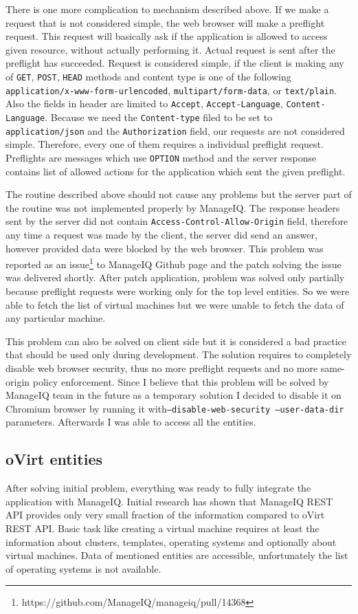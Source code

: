 There is one more complication to mechanism described above. If we make a request that is not considered simple, the web browser will make a preflight request. This request will basically ask if the application is allowed to access given resource, without actually performing it. Actual request is sent after the preflight has succeeded. Request is considered simple, if the client is making any of \texttt{GET}, \texttt{POST}, \texttt{HEAD} methods and content type is one of the following \texttt{application/x-www-form-urlencoded}, \texttt{multipart/form-data}, or \texttt{text/plain}. Also the fields in header are limited to \texttt{Accept}, \texttt{Accept-Language}, \texttt{Content-Language}. Because we need the \texttt{Content-type} filed to be set to \texttt{application/json} and the \texttt{Authorization} field, our requests are not considered simple. Therefore, every one of them requires a individual preflight request. Preflights are messages which use \texttt{OPTION} method and the server response contains list of allowed actions for the application which sent the given preflight.

The routine described above should not cause any problems but the server part of the routine was not implemented properly by ManageIQ. The response headers sent by the server did not contain \texttt{Access-Control-Allow-Origin} field, therefore any time a request was made by the client, the server did send an answer, however provided data were blocked by the web browser. This problem was reported as an issue\footnote{https://github.com/ManageIQ/manageiq/pull/14368} to ManageIQ Github page and the patch solving the issue was delivered shortly. After patch application, problem was solved only partially because preflight requests were working only for the top level entities. So we were able to fetch the list of virtual machines but we were unable to fetch the data of any particular machine.

This problem can also be solved on client side but it is considered a bad practice that should be used only during development. The solution requires to completely disable web browser security, thus no more preflight requests and no more same-origin policy enforcement. Since I believe that this problem will be solved by ManageIQ team in the future as a temporary solution I decided to disable it on Chromium browser by running it with\texttt{--disable-web-security --user-data-dir} parameters. Afterwards I was able to access all the entities.

\subsection{oVirt entities}
After solving initial problem, everything was ready to fully integrate the application with ManageIQ. Initial research has shown that ManageIQ REST API provides only very small fraction of the information compared to oVirt REST API.
Basic task like creating a virtual machine requires at least the information about clusters, templates, operating systems and optionally about virtual machines. Data of mentioned entities are accessible, unfortunately the list of operating systems is not available. 

